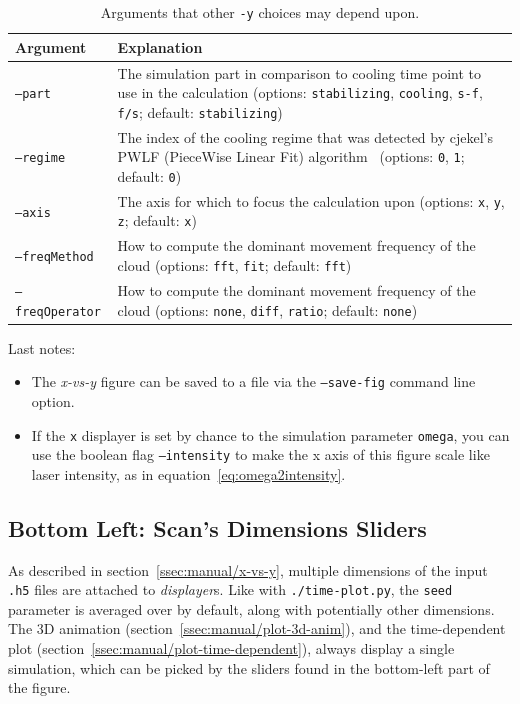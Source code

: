 \begin{table}[ht]
\centering
\begin{tabularx}{\textwidth}{l|X}
\textbf{Argument} & \textbf{Explanation} \\
\hline
\texttt{--part} & The simulation part in comparison to cooling time point to use in the calculation (options: \texttt{stabilizing}, \texttt{cooling}, \texttt{s-f}, \texttt{f/s}; default: \texttt{stabilizing}) \\
\hline
\texttt{--regime} & The index of the cooling regime that was detected by cjekel's PWLF (PieceWise Linear Fit) algorithm~\cite{pwlf} (options: \texttt{0}, \texttt{1}; default: \texttt{0}) \\
\hline
\texttt{--axis} & The axis for which to focus the calculation upon (options: \texttt{x}, \texttt{y}, \texttt{z}; default: \texttt{x}) \\
\hline
\texttt{--freqMethod} & How to compute the dominant movement frequency of the cloud (options: \texttt{fft}, \texttt{fit}; default: \texttt{fft}) \\
\hline
\texttt{--freqOperator} & How to compute the dominant movement frequency of the cloud (options: \texttt{none}, \texttt{diff}, \texttt{ratio}; default: \texttt{none}) \\
\end{tabularx}
\caption{Arguments that other \texttt{-y} choices may depend upon.}
\label{tbl:y-dependents}
\end{table}

Last notes:

\begin{itemize}
	\item The \textit{x-vs-y} figure can be saved to a file via the \texttt{--save-fig} command line option.
	\item If the \texttt{x} displayer is set by chance to the simulation parameter \texttt{omega}, you can use the boolean flag \texttt{--intensity} to make the x axis of this figure scale like laser intensity, as in equation~\ref{eq:omega2intensity}.
\end{itemize}

\subsection{Bottom Left: Scan's Dimensions Sliders}

As described in section~\ref{ssec:manual/x-vs-y}, multiple dimensions of the input \texttt{.h5} files are attached to \textit{displayer}s. Like with \texttt{./time-plot.py}, the \texttt{seed} parameter is averaged over by default, along with potentially other dimensions. The 3D animation (section~\ref{ssec:manual/plot-3d-anim}), and the time-dependent plot (section~\ref{ssec:manual/plot-time-dependent}), always display a single simulation, which can be picked by the sliders found in the bottom-left part of the figure.

